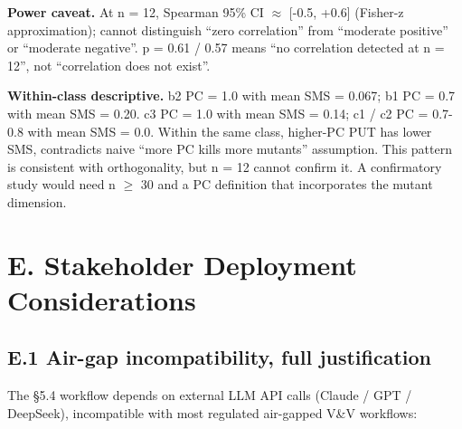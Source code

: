 \documentclass[acmsmall,screen,review]{acmart}
\begin{document}
\textbf{Power caveat.} At n = 12, Spearman 95\% CI $\approx$ {[}-0.5, +0.6{]}
(Fisher-z approximation); cannot distinguish ``zero correlation'' from ``moderate positive'' or
``moderate negative''. p = 0.61 / 0.57 means ``no correlation detected
at n = 12'', not ``correlation does not exist''.

\textbf{Within-class descriptive.} b2 PC = 1.0 with mean SMS = 0.067; b1
PC = 0.7 with mean SMS = 0.20. c3 PC = 1.0 with mean SMS = 0.14; c1 / c2
PC = 0.7-0.8 with mean SMS = 0.0. Within the same class, higher-PC PUT
has lower SMS, contradicts naive ``more PC kills more mutants''
assumption. This pattern is consistent with orthogonality, but n = 12
cannot confirm it. A confirmatory study would need n $\geq$ 30 and a PC
definition that incorporates the mutant dimension.


\section{E. Stakeholder Deployment Considerations}\label{e.-stakeholder-deployment-considerations-single-output-kernels-scope}

\subsection{E.1 Air-gap incompatibility, full justification}\label{e.1-air-gap-incompatibility-full-justification}

The §5.4 workflow depends on external LLM API calls (Claude / GPT /
DeepSeek), incompatible with most regulated air-gapped V\&V workflows:
\end{document}
